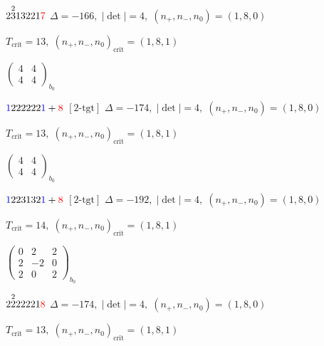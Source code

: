 \documentclass[10pt]{article}
\begin{document}
\smallskip

$2\overset{2}{3}13221\textcolor{red}{7}$ \quad $\Delta=-166,\; |\det|=4,\; (n_+,n_-,n_0)=(1,8,0)$

\hspace{1em}$T_{\text{crit}}=13,\; (n_+,n_-,n_0)_{\text{crit}}=(1,8,1)$

\hspace{2em}$\left(\begin{smallmatrix}4 & 4 \\ 4 & 4\end{smallmatrix}\right)_{\!b_0}$

\smallskip

$\textcolor{blue}{1}222222\textcolor{blue}{1}+\textcolor{red}{8}$ $\scriptstyle [2\text{-tgt}]$ \quad $\Delta=-174,\; |\det|=4,\; (n_+,n_-,n_0)=(1,8,0)$

\hspace{1em}$T_{\text{crit}}=13,\; (n_+,n_-,n_0)_{\text{crit}}=(1,8,1)$

\hspace{2em}$\left(\begin{smallmatrix}4 & 4 \\ 4 & 4\end{smallmatrix}\right)_{\!b_0}$

\smallskip

$\textcolor{blue}{1}223132\textcolor{blue}{1}+\textcolor{red}{8}$ $\scriptstyle [2\text{-tgt}]$ \quad $\Delta=-192,\; |\det|=4,\; (n_+,n_-,n_0)=(1,8,0)$

\hspace{1em}$T_{\text{crit}}=14,\; (n_+,n_-,n_0)_{\text{crit}}=(1,8,1)$

\hspace{2em}$\left(\begin{smallmatrix}0 & 2 & 2 \\ 2 & -2 & 0 \\ 2 & 0 & 2\end{smallmatrix}\right)_{\!b_0}$

\smallskip

$2\overset{2}{2}22221\textcolor{red}{8}$ \quad $\Delta=-174,\; |\det|=4,\; (n_+,n_-,n_0)=(1,8,0)$

\hspace{1em}$T_{\text{crit}}=13,\; (n_+,n_-,n_0)_{\text{crit}}=(1,8,1)$
\end{document}
